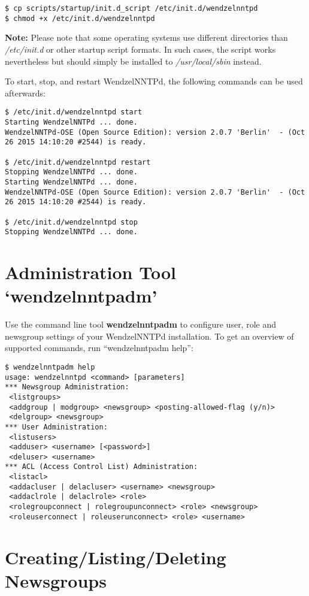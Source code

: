 \begin{verbatim}
$ cp scripts/startup/init.d_script /etc/init.d/wendzelnntpd
$ chmod +x /etc/init.d/wendzelnntpd
\end{verbatim}

{\bf Note:} Please note that some operating systems use different directories than {\it /etc/init.d} or other startup script formats. In such cases, the script works nevertheless but should simply be installed to {\it /usr/local/sbin} instead.


To start, stop, and restart WendzelNNTPd, the following commands can be used afterwards:

\begin{verbatim}
$ /etc/init.d/wendzelnntpd start
Starting WendzelNNTPd ... done.
WendzelNNTPd-OSE (Open Source Edition): version 2.0.7 'Berlin'  - (Oct
26 2015 14:10:20 #2544) is ready.

$ /etc/init.d/wendzelnntpd restart
Stopping WendzelNNTPd ... done.
Starting WendzelNNTPd ... done.
WendzelNNTPd-OSE (Open Source Edition): version 2.0.7 'Berlin'  - (Oct
26 2015 14:10:20 #2544) is ready.

$ /etc/init.d/wendzelnntpd stop
Stopping WendzelNNTPd ... done.
\end{verbatim}



\section{Administration Tool `wendzelnntpadm'}

Use the command line tool {\bf wendzelnntpadm} to configure user, role and newsgroup settings of your WendzelNNTPd installation. To get an overview of supported commands, run ``wendzelnntpadm help'':

\begin{verbatim}
$ wendzelnntpadm help
usage: wendzelnntpd <command> [parameters]
*** Newsgroup Administration:
 <listgroups>
 <addgroup | modgroup> <newsgroup> <posting-allowed-flag (y/n)>
 <delgroup> <newsgroup>
*** User Administration:
 <listusers>
 <adduser> <username> [<password>]
 <deluser> <username>
*** ACL (Access Control List) Administration:
 <listacl>
 <addacluser | delacluser> <username> <newsgroup>
 <addaclrole | delaclrole> <role>
 <rolegroupconnect | rolegroupunconnect> <role> <newsgroup>
 <roleuserconnect | roleuserunconnect> <role> <username>
\end{verbatim}

\section{Creating/Listing/Deleting Newsgroups}

